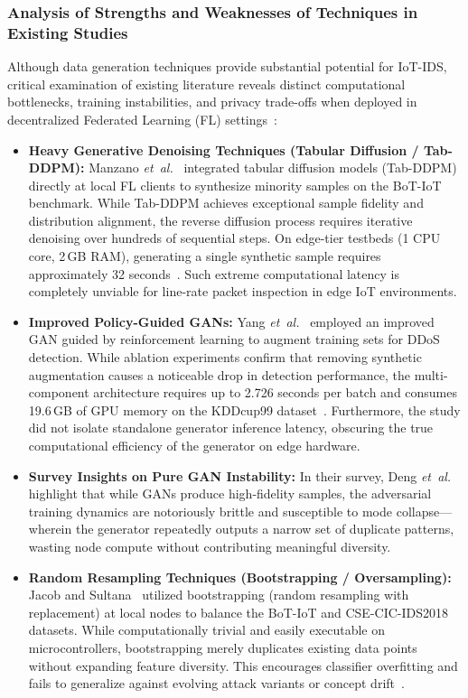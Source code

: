\subsubsection*{Analysis of Strengths and Weaknesses of Techniques in Existing Studies}
Although data generation techniques provide substantial potential for IoT-IDS, critical examination of existing literature reveals distinct computational bottlenecks, training instabilities, and privacy trade-offs when deployed in decentralized Federated Learning (FL) settings~\cite{deng2025}:
\begin{itemize}
    \item \textbf{Heavy Generative Denoising Techniques (Tabular Diffusion / Tab-DDPM):} Manzano \textit{et~al.}~\cite{manzano2025} integrated tabular diffusion models (Tab-DDPM) directly at local FL clients to synthesize minority samples on the BoT-IoT benchmark. While Tab-DDPM achieves exceptional sample fidelity and distribution alignment, the reverse diffusion process requires iterative denoising over hundreds of sequential steps. On edge-tier testbeds (1 CPU core, 2\,GB RAM), generating a single synthetic sample requires approximately 32 seconds~\cite{manzano2025}. Such extreme computational latency is completely unviable for line-rate packet inspection in edge IoT environments.
    \item \textbf{Improved Policy-Guided GANs:} Yang \textit{et~al.}~\cite{yang2025} employed an improved GAN guided by reinforcement learning to augment training sets for DDoS detection. While ablation experiments confirm that removing synthetic augmentation causes a noticeable drop in detection performance, the multi-component architecture requires up to 2.726 seconds per batch and consumes 19.6\,GB of GPU memory on the KDDcup99 dataset~\cite{yang2025}. Furthermore, the study did not isolate standalone generator inference latency, obscuring the true computational efficiency of the generator on edge hardware.
    \item \textbf{Survey Insights on Pure GAN Instability:} In their survey, Deng \textit{et~al.}~\cite{deng2025} highlight that while GANs produce high-fidelity samples, the adversarial training dynamics are notoriously brittle and susceptible to mode collapse---wherein the generator repeatedly outputs a narrow set of duplicate patterns, wasting node compute without contributing meaningful diversity.
    \item \textbf{Random Resampling Techniques (Bootstrapping / Oversampling):} Jacob and Sultana~\cite{jacob2026} utilized bootstrapping (random resampling with replacement) at local nodes to balance the BoT-IoT and CSE-CIC-IDS2018 datasets. While computationally trivial and easily executable on microcontrollers, bootstrapping merely duplicates existing data points without expanding feature diversity. This encourages classifier overfitting and fails to generalize against evolving attack variants or concept drift~\cite{deng2025, jacob2026}.

\end{itemize}
